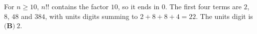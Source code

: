 For $n\ge10$, $n!!$ contains the factor $10$, so it ends in $0$. The first four terms are $2$, $8$, $48$ and $384$, with units digits summing to $2+8+8+4=22$. The units digit is $\boxed{\textbf{(B)}\ 2}$.
